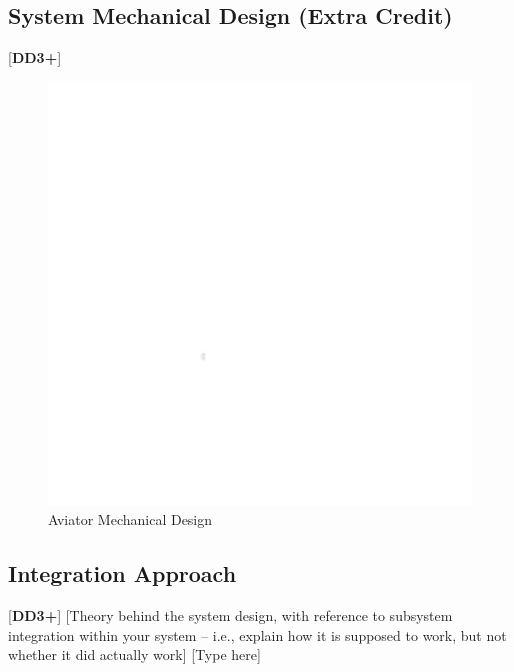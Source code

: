\clearpage
\subsection{System Mechanical Design (Extra Credit)}
[\textbf{DD3+}]
\begin{figure}[h]
    \centering
    \includegraphics[width=16cm]{images/white.png} %
    \caption{Aviator Mechanical Design}
\end{figure}

\clearpage
\subsection{Integration Approach}
[\textbf{DD3+}]
[Theory behind the system design, with reference to subsystem integration within your system – i.e., explain how it is supposed to work, but not whether it did actually work]
[Type here]

\clearpage
